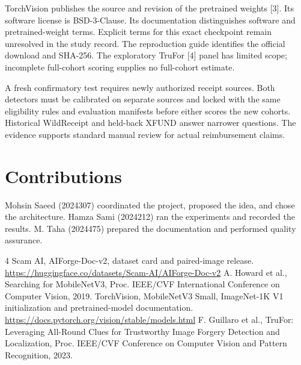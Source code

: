 \documentclass[conference]{IEEEtran}
\begin{document}
TorchVision publishes the source and revision of the pretrained weights [3]. Its software license is BSD-3-Clause. Its documentation distinguishes software and pretrained-weight terms. Explicit terms for this exact checkpoint remain unresolved in the study record. The reproduction guide identifies the official download and SHA-256. The exploratory TruFor [4] panel has limited scope; incomplete full-cohort scoring supplies no full-cohort estimate.

A fresh confirmatory test requires newly authorized receipt sources. Both detectors must be calibrated on separate sources and locked with the same eligibility rules and evaluation manifests before either scores the new cohorts. Historical WildReceipt and held-back XFUND answer narrower questions. The evidence supports standard manual review for actual reimbursement claims.
\section*{Contributions}
Mohsin Saeed (2024307) coordinated the project, proposed the idea, and chose the architecture. Hamza Sami (2024212) ran the experiments and recorded the results. M. Taha (2024475) prepared the documentation and performed quality assurance.
\begin{thebibliography}{4}
 Scam AI, AIForge-Doc-v2, dataset card and paired-image release. \url{https://huggingface.co/datasets/Scam-AI/AIForge-Doc-v2}
 A. Howard et al., Searching for MobileNetV3, Proc. IEEE/CVF International Conference on Computer Vision, 2019.
 TorchVision, MobileNetV3 Small, ImageNet-1K V1 initialization and pretrained-model documentation. \url{https://docs.pytorch.org/vision/stable/models.html}
 F. Guillaro et al., TruFor: Leveraging All-Round Clues for Trustworthy Image Forgery Detection and Localization, Proc. IEEE/CVF Conference on Computer Vision and Pattern Recognition, 2023.
\end{thebibliography}
\end{document}
